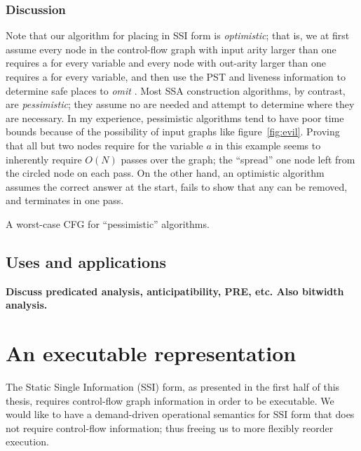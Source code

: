 \documentclass[12pt,titlepage]{article}
\newcommand{\mysection}[1]{\section{#1}\setcounter{figure}{0}}
\begin{document}
\subsubsection{Discussion}
Note that our algorithm for placing  in
SSI form is
\emph{optimistic}; that is, we at first assume every node in the
control-flow graph with input arity larger than one requires a
\phifunction{} for every variable and every node with out-arity larger
than one requires a \sigfunction{} for every variable, and then use
the PST and liveness information to determine safe places to
\emph{omit} .  Most SSA construction
algorithms, by contrast, are \emph{pessimistic}; they assume no
 are needed and attempt to determine where
they are necessary.  In my experience, pessimistic algorithms tend to
have poor time bounds because of the possibility of input graphs like
figure~\vref{fig:evil}.  Proving that all but two nodes require
 for the variable $a$ in this example seems to
inherently
require $O(N)$ passes over the graph; the  ``spread''
one node left from the circled node on each pass.  On the other hand,
an optimistic algorithm assumes the correct answer at the start, fails
to show that any  can be removed, and
terminates in one pass.

\begin{myfigure}[t]
\centering
\caption{A worst-case CFG for ``pessimistic'' algorithms.}
\label{fig:evil}
\end{myfigure}

\subsection{Uses and applications}
\textbf{Discuss predicated analysis, anticipatibility, PRE, etc.
	Also bitwidth analysis.}%

\mysection{An executable representation}\label{sec:ssiplus}
The Static Single Information (SSI) form, as presented in the first
half of this thesis,
requires control-flow graph information in order to be executable. We
would like to have a demand-driven operational semantics for SSI form
that does not require control-flow information; thus freeing us to
more flexibly reorder execution.
\end{document}
